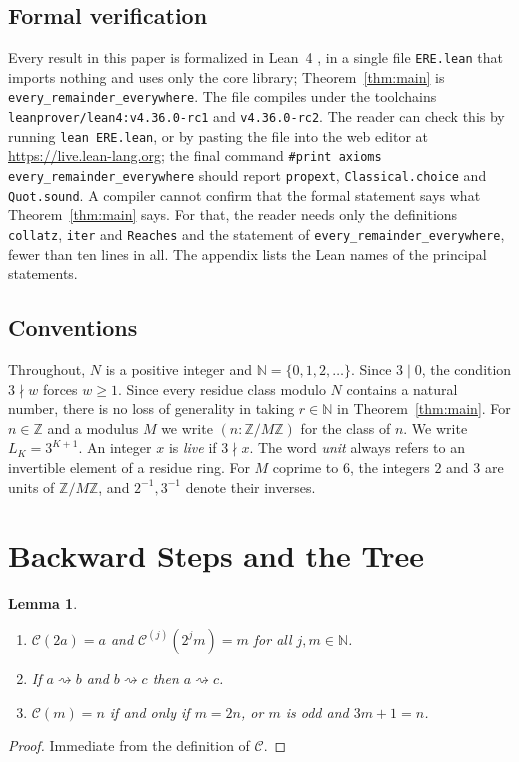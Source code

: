 \documentclass[11pt,reqno,oneside]{amsart}
\theoremstyle{plain}
\newtheorem{lemma}[theorem]{Lemma}
\theoremstyle{definition}
\numberwithin{equation}{section}
\newcommand{\N}{\mathbb{N}}
\newcommand{\Z}{\mathbb{Z}}
\newcommand{\ZM}{\Z/M\Z}
\newcommand{\C}{\mathcal{C}}
\newcommand{\reaches}{\rightsquigarrow}
\begin{document}
\subsection*{Formal verification}
Every result in this paper is formalized in Lean~4 \cite{deMouraUllrich21}, in a single file \texttt{ERE.lean} that imports nothing and uses only the core library; Theorem~\ref{thm:main} is \texttt{every\_\allowbreak remainder\_\allowbreak everywhere}. The file compiles under the toolchains \texttt{leanprover/\allowbreak lean4:\allowbreak v4.36.0-rc1} and \texttt{v4.36.0-rc2}. The reader can check this by running \texttt{lean ERE.lean}, or by pasting the file into the web editor at \url{https://live.lean-lang.org}; the final command \texttt{\#print axioms every\_\allowbreak remainder\_\allowbreak everywhere} should report \texttt{propext}, \texttt{Classical.choice} and \texttt{Quot.sound}. A compiler cannot confirm that the formal statement says what Theorem~\ref{thm:main} says. For that, the reader needs only the definitions \texttt{collatz}, \texttt{iter} and \texttt{Reaches} and the statement of \texttt{every\_\allowbreak remainder\_\allowbreak everywhere}, fewer than ten lines in all. The appendix lists the Lean names of the principal statements.

\subsection*{Conventions}
Throughout, $N$ is a positive integer and $\N=\{0,1,2,\dots\}$. Since $3\mid0$, the condition $3\nmid w$ forces $w\ge1$. Since every residue class modulo $N$ contains a natural number, there is no loss of generality in taking $r\in\N$ in Theorem~\ref{thm:main}. For $n\in\Z$ and a modulus $M$ we write $(n:\ZM)$ for the class of $n$. We write $L_K=3^{K+1}$. An integer $x$ is \emph{live} if $3\nmid x$. The word \emph{unit} always refers to an invertible element of a residue ring. For $M$ coprime to $6$, the integers $2$ and $3$ are units of $\ZM$, and $2^{-1},3^{-1}$ denote their inverses.

\section{Backward Steps and the Tree}\label{sec:tree}
\begin{lemma}\label{lem:steps}
\leavevmode
\begin{enumerate}[label=(\arabic*), leftmargin=1.8em]
\item $\C(2a)=a$ and $\C^{(j)}(2^jm)=m$ for all $j,m\in\N$.
\item If $a\reaches b$ and $b\reaches c$ then $a\reaches c$.
\item $\C(m)=n$ if and only if $m=2n$, or $m$ is odd and $3m+1=n$.
\end{enumerate}
\end{lemma}
\begin{proof}
Immediate from the definition of $\C$.
\end{proof}
\end{document}
